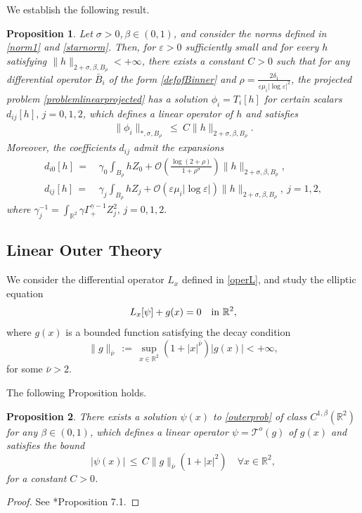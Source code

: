 \documentclass[11pt,reqno,a4paper]{amsart}
\numberwithin{equation}{section}
\newcommand{\R}{\mathbb{R}}
\newcommand{\inn}{{\quad\hbox{in } }}
\newcommand{\ve}{\varepsilon}
\newtheorem{prop}{Proposition}[section]
\begin{document}
We establish the following result.
\begin{prop}\label{prop1} Let $\sigma>0$,\,$\beta \in (0,1)$, and consider the norms defined in \eqref{norm1} and \eqref{starnorm}. Then, for $\ve>0$ sufficiently small and for every $h$ satisfying $\|h\|_{2+\sigma,\beta,B_{\rho}} < +\infty$, there exists a constant $C>0$ such that for any differential operator $\bar{B}_i$ of the form \eqref{defofBinner} and $\rho=\frac{2\delta_1}{\ve\mu_i|\log\ve|^2}$, the projected
problem \eqref{problemlinearprojected} has a solution $\phi_{i} = T_i[h]$ for certain scalars $d_{ij}[h], \,j=0,1,2$, which defines a linear operator of $h$ and satisfies
\begin{align*} 
\| \phi_{i}\|_{*,\sigma, B_\rho} \ \le\ C \|h \|_{2+\sigma,\beta, B_\rho} .
\end{align*}
Moreover, the coefficients $d_{ij}$ admit the expansions
\begin{align*}
d_{i0}[h]\, = & \, \gamma_0\int_{B_{\rho}}  h Z_0  + \mathcal{O}\left(\frac{\log(2+\rho)}{1+\rho^{\sigma}}\right)\|h \|_{2+\sigma,\beta, B_\rho} , \\    d_{ij}[h]\, = &\, \gamma_j\int_{B_{\rho}}  h Z_j  + \mathcal{O}\left(\ve\mu_i|\log\ve|\right)  \|h \|_{2+\sigma,\beta, B_\rho}, \ j=1,2,
\end{align*}
where
$\gamma_j^{-1} = \int_{\R^2} \gamma\Gamma^{\gamma-1}_{+} Z_j^2,\,j=0,1,2.$ \end{prop}
\subsection{Linear Outer Theory}
We consider the differential operator $L_x$ defined in \eqref{operL}, and study the elliptic equation  
	\begin{equation}
	\label{outerprob}
	L_x[\psi] + g(x) = 0  \inn \R^2 ,
	\end{equation}
	where $g(x)$ is a bounded function satisfying the decay condition
	$$
    \|g\|_{\bar{\nu}}\, :=\, \sup_{x\in \R^2}\left(1+|x|^{\bar{\nu}}\right)|g(x)|< +\infty ,
    $$
	for some $\bar{\nu} >2$. 
    
 The following Proposition holds.
\begin{prop}\label{propouter}
		There exists a solution $\psi(x)$ to \eqref{outerprob} of class $C^{1,\beta}(\R^2)$ for any $\beta\in(0,1)$, which defines a linear operator $\psi= {\mathcal T}^o (g) $ of $g(x)$
		and satisfies the bound
		\begin{equation*}
		|\psi(x)| \,\le \,C\| g\|_{\bar{\nu}} (1+ |x|^2) \quad \forall x \in \R^2,
		\end{equation*}
		for a constant $C>0$.
	\end{prop}
\begin{proof}
See \cite{MR4417384}*{Proposition 7.1}.
\end{proof}
\end{document}
